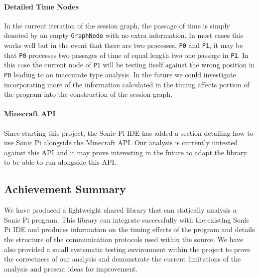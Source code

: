 \documentclass[11pt, abstracton, twoside, titlepage=true]{scrartcl}
\begin{document}
\paragraph{Detailed Time Nodes}
In the current iteration of the session graph, the passage of time is simply
denoted by an empty \texttt{GraphNode} with no extra information. In most cases
this works well but in the event that there are two processes, \texttt{P0} and
\texttt{P1}, it may be that \texttt{P0} processes two passages of time of equal
length two one passage in \texttt{P1}. In this case the current node of 
\texttt{P1} will be testing itself against the wrong position in \texttt{P0} 
leading to an inaccurate type analysis. In the future we could investigate
incorporating more of the information calculated in the timing affects portion
of the program into the construction of the session graph.

\paragraph{Minecraft API}
Since starting this project, the Sonic Pi IDE has added a section detailing how 
to use Sonic Pi alongside the Minecraft API. Our analysis is currently untested 
against this API and it may prove interesting in the future to adapt the library 
to be able to run alongside this API. 

\subsection{Achievement Summary}
We have produced a lightweight shared library that can statically analysis a 
Sonic Pi program. This library can integrate successfully with the existing 
Sonic Pi IDE and produces information on the timing effects of the program and 
details the structure of the communication protocols used within the source. We 
have also provided a small systematic testing environment within the project 
to prove the correctness of our analysis and demonstrate the current limitations 
of the analysis and present ideas for improvement.

\newpage
\end{document}
